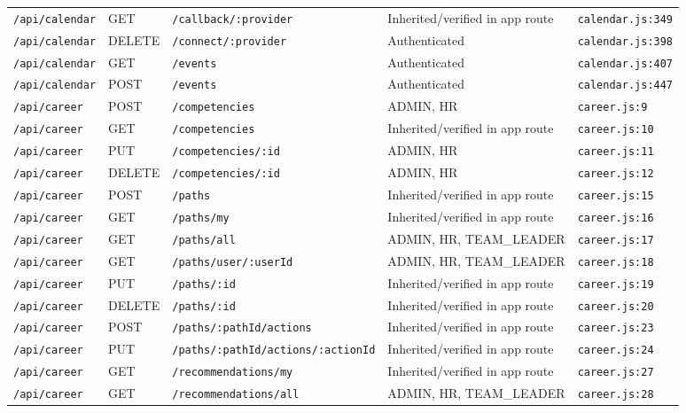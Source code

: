 \begin{landscape}
\begin{longtable}{p{}p{}p{}p{}p{}}
\texttt{/api/calendar} & GET & \texttt{/callback/:provider} & Inherited/verified in app route & \texttt{calendar.js:349}\\
\texttt{/api/calendar} & DELETE & \texttt{/connect/:provider} & Authenticated & \texttt{calendar.js:398}\\
\texttt{/api/calendar} & GET & \texttt{/events} & Authenticated & \texttt{calendar.js:407}\\
\texttt{/api/calendar} & POST & \texttt{/events} & Authenticated & \texttt{calendar.js:447}\\
\texttt{/api/career} & POST & \texttt{/competencies} & ADMIN,  HR & \texttt{career.js:9}\\
\texttt{/api/career} & GET & \texttt{/competencies} & Inherited/verified in app route & \texttt{career.js:10}\\
\texttt{/api/career} & PUT & \texttt{/competencies/:id} & ADMIN,  HR & \texttt{career.js:11}\\
\texttt{/api/career} & DELETE & \texttt{/competencies/:id} & ADMIN,  HR & \texttt{career.js:12}\\
\texttt{/api/career} & POST & \texttt{/paths} & Inherited/verified in app route & \texttt{career.js:15}\\
\texttt{/api/career} & GET & \texttt{/paths/my} & Inherited/verified in app route & \texttt{career.js:16}\\
\texttt{/api/career} & GET & \texttt{/paths/all} & ADMIN,  HR,  TEAM\_LEADER & \texttt{career.js:17}\\
\texttt{/api/career} & GET & \texttt{/paths/user/:userId} & ADMIN,  HR,  TEAM\_LEADER & \texttt{career.js:18}\\
\texttt{/api/career} & PUT & \texttt{/paths/:id} & Inherited/verified in app route & \texttt{career.js:19}\\
\texttt{/api/career} & DELETE & \texttt{/paths/:id} & Inherited/verified in app route & \texttt{career.js:20}\\
\texttt{/api/career} & POST & \texttt{/paths/:pathId/actions} & Inherited/verified in app route & \texttt{career.js:23}\\
\texttt{/api/career} & PUT & \texttt{/paths/:pathId/actions/:actionId} & Inherited/verified in app route & \texttt{career.js:24}\\
\texttt{/api/career} & GET & \texttt{/recommendations/my} & Inherited/verified in app route & \texttt{career.js:27}\\
\texttt{/api/career} & GET & \texttt{/recommendations/all} & ADMIN,  HR,  TEAM\_LEADER & \texttt{career.js:28}\\

\end{longtable}
\end{landscape}
